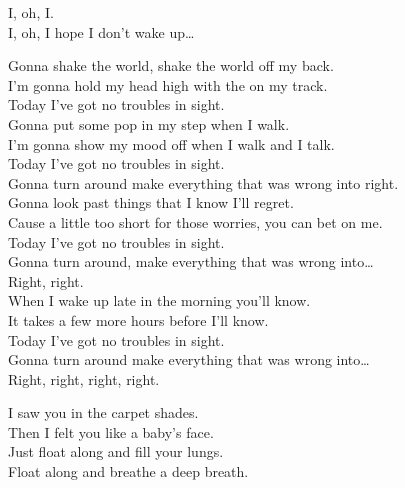 I, oh, I. \\
I, oh, I hope I don't wake up… \\





Gonna shake the world, shake the world off my back. \\
I'm gonna hold my head high with the  on my track. \\
Today I've got no troubles in sight. \\

Gonna put some pop in my step when I walk. \\
I'm gonna show my mood off when I walk and I talk. \\
Today I've got no troubles in sight. \\
Gonna turn around make everything that was wrong into right. \\

Gonna look past things that I know I'll regret. \\
Cause  a little too short for those worries, you can bet on me. \\
Today I've got no troubles in sight. \\
Gonna turn around, make everything that was wrong into… \\
Right, right. \\

When I wake up late in the morning you'll know. \\
It takes a few more hours before I'll know. \\
Today I've got no troubles in sight. \\
Gonna turn around make everything that was wrong into… \\
Right, right, right, right. \\





I saw you in the carpet shades. \\
Then I felt you like a baby's face. \\
Just float along and fill your lungs. \\
Float along and breathe a deep breath. \\


